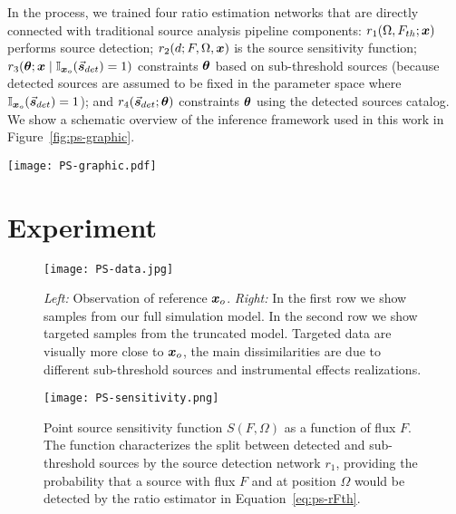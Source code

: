 In the process, we trained four ratio estimation networks that are directly connected with traditional source analysis pipeline components: $ r_1(\Omega, F_{th}; \bm{x})$ performs source detection; $r_2(d; F, \Omega, \bm{x})$ is the source sensitivity function; $ r_3(\bm{\theta}; \bm{x}\mid \mathbb{I}_{\bm{x}_o}(\vec{\boldsymbol{s}}_{det})=1)$ constraints $\bm{\theta}$ based on sub-threshold sources (because detected sources are assumed to be fixed in the parameter space where $\mathbb{I}_{\bm{x}_o}(\vec{\boldsymbol{s}}_{det})=1$); and $r_4(\vec{\boldsymbol{s}}_{det}; \bm{\theta})$ constraints $\bm{\theta}$ using the detected sources catalog.
We show a schematic overview of the inference framework used in this work in Figure~\ref{fig:ps-graphic}.

\begin{sidewaysfigure}
    \centering
    \texttt{[image: PS-graphic.pdf]}
    \caption{Illustration of our inference framework (see Section~\ref{sec:ps-method} for details). \textit{Left panel}: A source detection network $r_1$ and the corresponding sensitivity network $r_2$ are trained based on the full simulation model. \textit{Right panel}: Bright sources are constrained in the truncated simulation model, while sub-threshold sources vary freely.  Two inference networks are trained to capture information from sub-threshold sources ($r_3$) and detected sources ($r_4$).
    }
    \label{fig:ps-graphic}
\end{sidewaysfigure}


\section{Experiment}
\label{sec:ps-results}

\begin{figure}
    \centering
    \texttt{[image: PS-data.jpg]}
    \caption{
      \textit{Left:} Observation of reference $\bm{x}_o$. 
      \textit{Right:} In the first row we show samples from our full simulation model. In the second row we show targeted samples from the truncated model. Targeted data are visually more close to $\bm{x}_o$, the main dissimilarities are due to different sub-threshold sources and instrumental effects realizations.
    }
    \label{fig:ps-data}
\end{figure}

\begin{figure}
    \centering
    \texttt{[image: PS-sensitivity.png]}
    \caption{Point source sensitivity function $S(F, \Omega)$ as a function of flux $F$. The function characterizes the split between detected and sub-threshold sources by the source detection network $r_1$, providing the probability that a source with flux $F$ and at position $\Omega$ would be detected by the ratio estimator in Equation~\eqref{eq:ps-rFth}.  
    }
    \label{fig:ps-sensitivity}
\end{figure}

